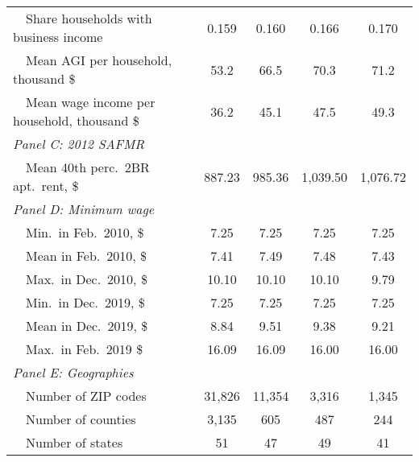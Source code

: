 \begin{landscape}
\begin{table}[hbt!]
\begin{tabular}{@{}lcccc@{}}
        $\quad$Share households with business income        & 0.159    & 0.160   & 0.166   & 0.170          \\
        $\quad$Mean AGI per household, thousand \$          & 53.2 & 66.5 & 70.3 & 71.2     \\
        $\quad$Mean wage income per household, thousand \$  & 36.2 & 45.1 & 47.5 & 49.3     \\
        \textit{Panel C: 2012 SAFMR}                        &       &       &        &               \\
        $\quad$Mean 40th perc.\ 2BR apt.\ rent, \$          & 887.23   & 985.36  & 1,039.50  & 1,076.72          \\
        \textit{Panel D: Minimum wage}                       &       &       &        &              \\
        $\quad$Min.\ in Feb.\ 2010, \$                      & 7.25   & 7.25  & 7.25  & 7.25         \\
        $\quad$Mean in Feb.\ 2010, \$                       & 7.41   & 7.49  & 7.48  & 7.43         \\
        $\quad$Max.\ in Dec.\ 2010, \$                      & 10.10   & 10.10  & 10.10  & 9.79         \\
        $\quad$Min.\ in Dec.\ 2019, \$                      & 7.25   & 7.25  & 7.25  & 7.25         \\
        $\quad$Mean in Dec.\ 2019, \$                       & 8.84   & 9.51  & 9.38  & 9.21         \\
        $\quad$Max.\ in Feb.\ 2019 \$                       & 16.09   & 16.09  & 16.00  & 16.00         \\
        \textit{Panel E: Geographies}                       &       &       &        &               \\
        $\quad$Number of ZIP codes                          & 31,826  & 11,354 & 3,316 & 1,345             \\
        $\quad$Number of counties                           & 3,135  & 605 & 487 & 244             \\
        $\quad$Number of states                             & 51  & 47 & 49 & 41             \\ \bottomrule
    \end{tabular}


\end{table}
\end{landscape}
